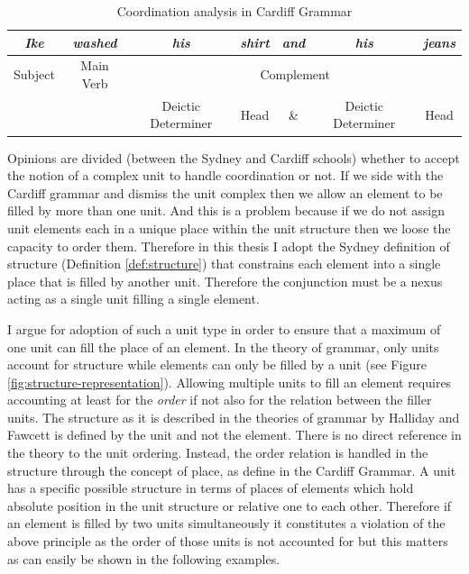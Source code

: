     \begin{table}[!ht]
    	\centering
            \begin{tabular}{cc|c|c|c|c|c|}
                \hline
                \multicolumn{1}{|c|}{\textit{Ike}} & \textit{washed} & \textit{his}       & \textit{shirt} & \textit{and} & \textit{his}       & \textit{jeans} \\ \hline
                \multicolumn{1}{|c|}{Subject}      & Main Verb       & \multicolumn{5}{c|}{Complement}                                                          \\ \hline
                 &  & Deictic Determiner & Head & \& & Deictic Determiner & Head \\ \cline{3-7} 
            \end{tabular}%
    	\caption{Coordination analysis in Cardiff Grammar}
    	\label{ex:Cardiff-example-analisys}
    \end{table}
    
    Opinions are divided (between the Sydney and Cardiff schools) whether to accept the notion of a complex unit to handle coordination or not. If we side with the Cardiff grammar and dismiss the unit complex then we allow an element to be filled by more than one unit. And this is a problem because if we do not assign unit elements each in a unique place within the unit structure then we loose the capacity to order them. Therefore in this thesis I adopt the Sydney definition of structure (Definition \ref{def:structure}) that constrains each element into a single place that is filled by another unit. Therefore the conjunction must be a nexus acting as a single unit filling a single element. 
    
    I argue for adoption of such a unit type in order to ensure that a maximum of one unit can fill the place of an element. In the theory of grammar, only units account for structure while elements can only be filled by a unit (see Figure \ref{fig:structure-representation}). Allowing multiple units to fill an element requires accounting at least for the \textit{order} if not also for the relation between the filler units. The structure as it is described in the theories of grammar by Halliday \citep{Halliday2002} and Fawcett \citep{Fawcett2000} is defined by the unit and not the element. There is no direct reference in the theory to the unit ordering. Instead, the order relation is handled in the structure through the concept of place, as define in the Cardiff Grammar. A unit has a specific possible structure in terms of places of elements which hold absolute position in the unit structure or relative one to each other. Therefore if an element is filled by two units simultaneously it constitutes a violation of the above principle as the order of those units is not accounted for but this matters as can easily be shown in the following examples.
    
